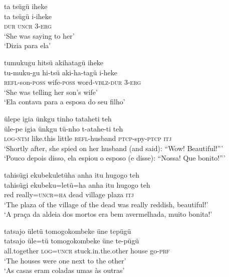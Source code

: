\documentclass[output=paper,
modfonts,nonflat
]{langsci/langscibook}
\begin{document}
\ea ta tsügü iheke \\[.3em]
\gll ta	tsügü 		i-iheke \\
\textsc{dur} 	\textsc{uncr} 	3-\textsc{erg} \\
\glt ‘She was saying to her’ \\
‘Dizia para ela’ \\
\z

\ea tumukugu hitsü akihatagü iheke \\[.3em]
\gll tu-muku-gu		hi-tsü		aki-ha-tagü			i-heke \\
\textsc{refl}-son-\textsc{poss} 	wife-\textsc{poss} 	word\textsc{-vblz}-\textsc{dur}	3-\textsc{erg} \\
\glt ‘She was telling her son's wife’ \\
‘Ela contava para a esposa do seu filho’ \\
\z

 
\newpage 
\ea ülepe igia ünkgu tinho tataheti teh \\[.3em]
\gll üle-pe		igia		ünkgu	tü-nho			t-atahe-ti		teh \\
\textsc{log-ntm} 	like.this 	little 	\textsc{refl}-husband 	\textsc{ptcp}-spy-\textsc{ptcp}	\textsc{itj} \\
\glt ‘Shortly after, she spied on her husband (and said): “Wow! Beautiful!”’ \\
‘Pouco depois disso, ela espiou o esposo (e disse): “Nossa! Que bonito!”’ \\
\z

\ea tahisügi{\footnotemark}{} ekubekuletüha anha itu hugogo{\footnotemark} teh \\[.3em]
\gll tahisügi	ekubeku=letü=ha	anha	itu	hugogo	teh \\
red 		really\textsc{=uncr=ha}	dead 	village	plaza 		\textsc{itj} \\
\glt‘The plaza of the village of the dead was really reddish, beautiful!’ \\
‘A praça da aldeia dos mortos era bem avermelhada, muito bonita!’ \\
\fnminus
{}
\fnplus
{}
\z

\ea tatsajo ületü tomogokombeke üne tepügü \\[.3em]
\gll tatsajo		üle=tü		tomogokombeke	üne	te-pügü \\
all.together 	\textsc{log=uncr} 	stuck.in.the.other 	house	go-\textsc{prf} \\
\glt ‘The houses were one next to the other’ \\
‘As casas eram coladas umas às outras’ \\
\z
\end{document}
